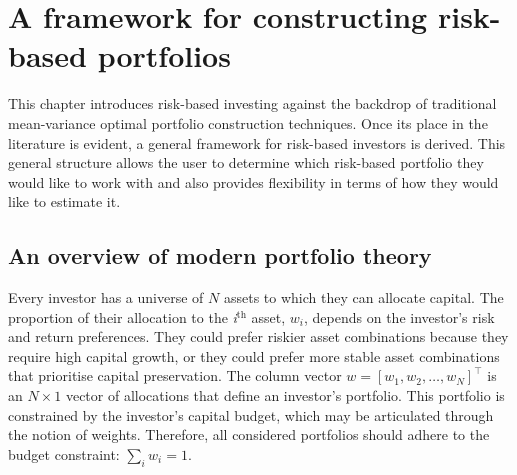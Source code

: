 \documentclass[a4paper,11pt,nocenter,bold,noupper,headcount]{mythesis}
\theoremstyle{plain}
\theoremstyle{definition}
\begin{document}
\chapter{A framework for constructing risk-based portfolios} \label{gen_frame_ch}

This chapter introduces risk-based investing against the backdrop of traditional mean-variance optimal portfolio construction techniques. Once its place in the literature is evident, a general framework for risk-based investors is derived. This general structure allows the user to determine which risk-based portfolio they would like to work with and also provides flexibility in terms of how they would like to estimate it.

\section{An overview of modern portfolio theory} \label{MPT}
Every investor has a universe of $N$ assets to which they can allocate capital. The proportion of their allocation to the \textit{i}$^{\text{th}}$ asset, $w_i$, depends on the investor's risk and return preferences. They could prefer riskier asset combinations because they require high capital growth, or they could prefer more stable asset combinations that prioritise capital preservation. The column vector $w = [w_1,w_2,…,w_N]^\intercal$ is an $N \times 1$ vector of allocations that define an investor's portfolio. This portfolio is constrained by the investor's capital budget, which may be articulated through the notion of weights. Therefore, all considered portfolios should adhere to the budget constraint: $\sum_i w_i =  1$.
\end{document}
